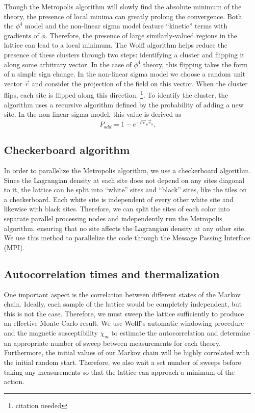 \documentclass[12pt]{report}
\begin{document}
Though the Metropolis algorithm will slowly find the absolute minimum of the theory, the presence of local minima can greatly prolong the convergence. Both the $\phi^4$ model and the non-linear sigma model feature ``kinetic'' terms with gradients of $\phi$. Therefore, the presence of large similarly-valued regions in the lattice can lead to a local minimum. The Wolff algorithm helps reduce the presence of these clusters through two steps: identifying a cluster and flipping it along some arbitrary vector. In the case of $\phi^4$ theory, this flipping takes the form of a simple sign change. In the non-linear sigma model we choose a random unit vector $\vec r$ and consider the projection of the field on this vector. When the cluster flips, each site is flipped along this direction. \footnote{citation needed}. To identify the cluster, the algorithm uses a recursive algorithm defined by the probability of adding a new site. In the non-linear sigma model, this value is derived as 
\begin{equation}
    P_{add} = 1-e^{- \beta \vec e_a\vec e_b}.
\end{equation}


\subsection{Checkerboard algorithm}

In order to parallelize the Metropolis algorithm, we use a checkerboard algorithm. Since the Lagrangian density at each site does not depend on any sites diagonal to it, the lattice can be split into ``white'' sites and ``black'' sites, like the tiles on a checkerboard. Each white site is independent of every other white site and likewise with black sites. Therefore, we can split the sites of each color into separate parallel processing nodes and independently run the Metropolis algorithm, ensuring that no site affects the Lagrangian density at any other site. We use this method to parallelize the code through the Message Passing Interface (MPI).

\subsection{Autocorrelation times and thermalization}
One important aspect is the correlation between different states of the Markov chain. Ideally, each sample of the lattice would be completely independent, but this is not the case. Therefore, we must sweep the lattice sufficiently to produce an effective Monte Carlo result. We use Wolff's automatic windowing procedure \cite{wolff2007} and the magnetic susceptibility $\chi_m$ to estimate the autocorrelation and determine an appropriate number of sweep between measurements for each theory. Furthermore, the initial values of our Markov chain will be highly correlated with the initial random start. Therefore, we also wait a set number of sweeps before taking any measurements so that the lattice can approach a minimum of the action.
\end{document}
